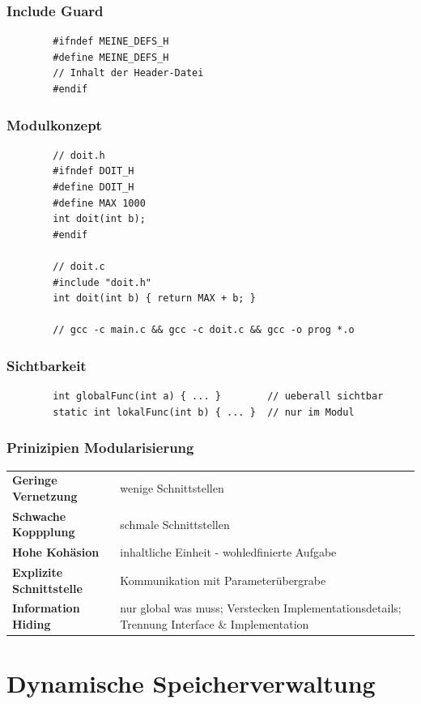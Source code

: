 \documentclass[a4paper,9pt]{article}
\begin{document}
	\subsubsection{Include Guard}
	\begin{lstlisting}
		#ifndef MEINE_DEFS_H
		#define MEINE_DEFS_H
		// Inhalt der Header-Datei
		#endif
	\end{lstlisting}
	
	\subsubsection{Modulkonzept}
	\begin{lstlisting}
		// doit.h
		#ifndef DOIT_H
		#define DOIT_H
		#define MAX 1000
		int doit(int b);
		#endif
		
		// doit.c
		#include "doit.h"
		int doit(int b) { return MAX + b; }
		
		// gcc -c main.c && gcc -c doit.c && gcc -o prog *.o
	\end{lstlisting}
	
	\subsubsection{Sichtbarkeit}
	\begin{lstlisting}
		int globalFunc(int a) { ... }        // ueberall sichtbar
		static int lokalFunc(int b) { ... }  // nur im Modul
	\end{lstlisting}
	
	\subsubsection{Prinizipien Modularisierung}
	\begin{tabular}{ll}
		\textbf{Geringe Vernetzung}  & wenige Schnittstellen \\
		\textbf{Schwache Koppplung} & schmale Schnittstellen \\
		\textbf{Hohe Kohäsion}  & inhaltliche Einheit - wohledfinierte Aufgabe \\
		\textbf{Explizite Schnittstelle} & Kommunikation mit Parameterübergrabe \\
		\textbf{Information Hiding} & nur global was muss; Verstecken Implementationsdetails; Trennung Interface \& Implementation \\
	\end{tabular}

	
	\section{Dynamische Speicherverwaltung}
	
\end{document}
